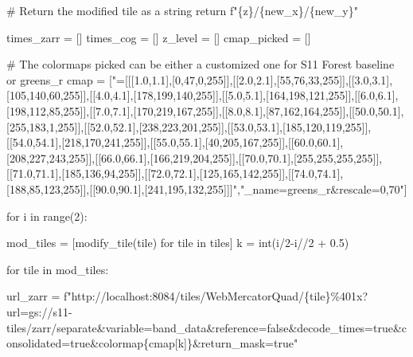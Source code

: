 \documentclass[
  oneside,
  open=any]{scrbook}
\newenvironment{Shaded}{\begin{snugshade}}{\end{snugshade}}
\newcommand{\BuiltInTok}[1]{\textcolor[rgb]{0.00,0.23,0.31}{#1}}
\newcommand{\CommentTok}[1]{\textcolor[rgb]{0.37,0.37,0.37}{#1}}
\newcommand{\ControlFlowTok}[1]{\textcolor[rgb]{0.00,0.23,0.31}{#1}}
\newcommand{\DecValTok}[1]{\textcolor[rgb]{0.68,0.00,0.00}{#1}}
\newcommand{\FloatTok}[1]{\textcolor[rgb]{0.68,0.00,0.00}{#1}}
\newcommand{\KeywordTok}[1]{\textcolor[rgb]{0.00,0.23,0.31}{#1}}
\newcommand{\NormalTok}[1]{\textcolor[rgb]{0.00,0.23,0.31}{#1}}
\newcommand{\OperatorTok}[1]{\textcolor[rgb]{0.37,0.37,0.37}{#1}}
\newcommand{\SpecialCharTok}[1]{\textcolor[rgb]{0.37,0.37,0.37}{#1}}
\newcommand{\SpecialStringTok}[1]{\textcolor[rgb]{0.13,0.47,0.30}{#1}}
\newcommand{\StringTok}[1]{\textcolor[rgb]{0.13,0.47,0.30}{#1}}
\begin{document}
\begin{Shaded}
\begin{Highlighting}[]
    \CommentTok{\# Return the modified tile as a string}
    \ControlFlowTok{return} \SpecialStringTok{f"}\SpecialCharTok{\{}\NormalTok{z}\SpecialCharTok{\}}\SpecialStringTok{/}\SpecialCharTok{\{}\NormalTok{new\_x}\SpecialCharTok{\}}\SpecialStringTok{/}\SpecialCharTok{\{}\NormalTok{new\_y}\SpecialCharTok{\}}\SpecialStringTok{"}

\NormalTok{times\_zarr }\OperatorTok{=}\NormalTok{ []}
\NormalTok{times\_cog }\OperatorTok{=}\NormalTok{ []}
\NormalTok{z\_level }\OperatorTok{=}\NormalTok{ []}
\NormalTok{cmap\_picked }\OperatorTok{=}\NormalTok{ []}

\CommentTok{\# The colormaps picked can be either a customized one for S11 Forest baseline or greens\_r}
\NormalTok{cmap }\OperatorTok{=}\NormalTok{ [}\StringTok{"=[[[1.0,1.1],[0,47,0,255]],[[2.0,2.1],[55,76,33,255]],[[3.0,3.1],[105,140,60,255]],[[4.0,4.1],[178,199,140,255]],[[5.0,5.1],[164,198,121,255]],[[6.0,6.1],[198,112,85,255]],[[7.0,7.1],[170,219,167,255]],[[8.0,8.1],[87,162,164,255]],[[50.0,50.1],[255,183,1,255]],[[52.0,52.1],[238,223,201,255]],[[53.0,53.1],[185,120,119,255]],[[54.0,54.1],[218,170,241,255]],[[55.0,55.1],[40,205,167,255]],[[60.0,60.1],[208,227,243,255]],[[66.0,66.1],[166,219,204,255]],[[70.0,70.1],[255,255,255,255]],[[71.0,71.1],[185,136,94,255]],[[72.0,72.1],[125,165,142,255]],[[74.0,74.1],[188,85,123,255]],[[90.0,90.1],[241,195,132,255]]]"}\NormalTok{,}\StringTok{"\_name=greens\_r\&rescale=0,70"}\NormalTok{]}

\ControlFlowTok{for}\NormalTok{ i }\KeywordTok{in} \BuiltInTok{range}\NormalTok{(}\DecValTok{2}\NormalTok{):}

\NormalTok{    mod\_tiles }\OperatorTok{=}\NormalTok{ [modify\_tile(tile) }\ControlFlowTok{for}\NormalTok{ tile }\KeywordTok{in}\NormalTok{ tiles]}
\NormalTok{    k }\OperatorTok{=} \BuiltInTok{int}\NormalTok{(i}\OperatorTok{/}\DecValTok{2}\OperatorTok{{-}}\NormalTok{i}\OperatorTok{//}\DecValTok{2} \OperatorTok{+} \FloatTok{0.5}\NormalTok{)}

    \ControlFlowTok{for}\NormalTok{ tile }\KeywordTok{in}\NormalTok{ mod\_tiles:}

\NormalTok{        url\_zarr }\OperatorTok{=} \SpecialStringTok{f"http://localhost:8084/tiles/WebMercatorQuad/}\SpecialCharTok{\{}\NormalTok{tile}\SpecialCharTok{\}}\SpecialStringTok{\%401x?url=gs://s11{-}tiles/zarr/separate\&variable=band\_data\&reference=false\&decode\_times=true\&consolidated=true\&colormap}\SpecialCharTok{\{}\NormalTok{cmap[k]}\SpecialCharTok{\}}\SpecialStringTok{\&return\_mask=true"}


\end{Highlighting}
\end{Shaded}
\end{document}
